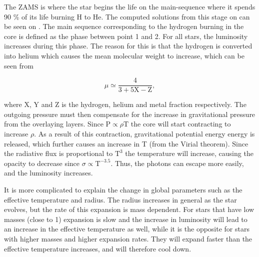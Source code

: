 The ZAMS is where the star begins the life on the main-sequence where it spends 90 \% of its life burning H to He. The computed solutions from this stage on can be seen on . The main sequence corresponding to the hydrogen burning in the core is defined as the phase between point 1 and 2. For all stars, the luminosity increases during this phase. The reason for this is that the hydrogen is converted into helium which causes the mean molecular weight to increase, which can be seen from

\begin{equation}
\mu \simeq \frac{4}{3+5\text{X}-\text{Z}},
\end{equation}

\noindent where X, Y and Z is the hydrogen, helium and metal fraction respectively. The outgoing pressure must then compensate for the increase in gravitational pressure from the overlaying layers. Since $\text{P} \propto \rho \text{T}$ the core will start contracting to increase $\rho$. As a result of this contraction, gravitational potential energy energy is released, which further causes an increase in T (from the Virial theorem). Since the radiative flux is proportional to $\text{T}^{3}$ the temperature will increase, causing the opacity to decrease since $\sigma \propto \text{T}^{-3.5}$. Thus, the photons can escape more easily, and the luminosity increases. 

It is more complicated to explain the change in global parameters such as the effective temperature and radius. The radius increases in general as the star evolves, but the rate of this expansion is mass dependent. For stars that have low masses (close to 1\msun ) expansion is slow and the increase in luminosity will lead to an increase in the effective temperature as well, while it is the opposite for stars with higher masses and higher expansion rates. They will expand faster than the effective temperature increases, and will therefore cool down. 

